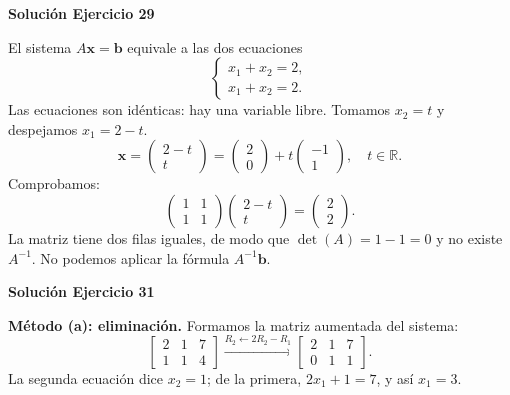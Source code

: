 \documentclass[12pt]{article}
\theoremstyle{remark}
\newcommand{\vect}[1]{\boldsymbol{#1}}
\begin{document}
\par\bigskip\noindent\textbf{Solución Ejercicio 29}\par\nobreak
El sistema $A\vect x=\vect b$ equivale a las dos ecuaciones
\[
\begin{cases}x_1+x_2=2,\\x_1+x_2=2.\end{cases}
\]
Las ecuaciones son idénticas: hay una variable libre. Tomamos $x_2=t$ y despejamos $x_1=2-t$.
\[
\boxed{\vect x=\begin{pmatrix}2-t\\t\end{pmatrix}=\begin{pmatrix}2\\0\end{pmatrix}+t\begin{pmatrix}-1\\1\end{pmatrix},\quad t\in\mathbb R}.
\]
Comprobamos:
\[
\begin{pmatrix}1&1\\1&1\end{pmatrix}\begin{pmatrix}2-t\\t\end{pmatrix}=\begin{pmatrix}2\\2\end{pmatrix}.
\]
La matriz tiene dos filas iguales, de modo que $\det(A)=1-1=0$ y no existe $A^{-1}$. No podemos aplicar la fórmula $A^{-1}\vect b$.


\par\bigskip\noindent\textbf{Solución Ejercicio 31}\par\nobreak
\textbf{Método (a): eliminación.} Formamos la matriz aumentada del sistema:
\[
\left[\begin{array}{rr|r}2&1&7\\1&1&4\end{array}\right]\xrightarrow{R_2\leftarrow2R_2-R_1}\left[\begin{array}{rr|r}2&1&7\\0&1&1\end{array}\right].
\]
La segunda ecuación dice $x_2=1$; de la primera, $2x_1+1=7$, y así $x_1=3$.
\end{document}
